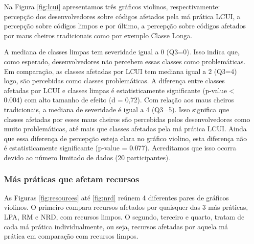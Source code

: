 Na Figura \ref{fig:lcui} apresentamos três gráficos violinos, respectivamente: percepção dos desenvolvedores sobre códigos afetados pela má prática \textsc{LCUI}, a percepção sobre códigos limpos e por último, a percepção sobre códigos afetados por maus cheiros tradicionais como por exemplo Classe Longa. 

A mediana de classes limpas tem severidade igual a 0 (Q3=0). Isso indica que, como esperado, desenvolvedores não percebem essas classes como problemáticas. Em comparação, as classes afetadas por \textsc{LCUI} tem mediana igual a 2 (Q3=4) logo, são percebidas como classes problemáticas. A diferença entre classes afetadas por \textsc{LCUI} e classes limpas é estatisticamente significante (p-value < 0.004) com alto tamanho de efeito (d = 0,72). Com relação aos maus cheiros tradicionais, a mediana de severidade é igual a 4 (Q3=5). Isso significa que classes afetadas por esses maus cheiros são percebidas pelos desenvolvedores como muito problemáticas, até mais que classes afetadas pela má prática \textsc{LCUI}. Ainda que essa diferença de percepção esteja clara no gráfico violino, esta diferença não é estatisticamente significante (p-value = 0.077). Acreditamos que isso ocorra devido ao número limitado de dados (20 participantes).


\subsubsection{Más práticas que afetam recursos}

As Figuras \ref{fig:resources} até \ref{fig:nrd} reúnem 4 diferentes pares de gráficos violinos. O primeiro compara recursos afetados por quaisquer das 3 más práticas, \textsc{LPA}, \textsc{RM} e \textsc{NRD}, com recursos limpos. O segundo, terceiro e quarto, tratam de cada má prática individualmente, ou seja, recursos afetadas por aquela má prática em comparação com recursos limpos. 

